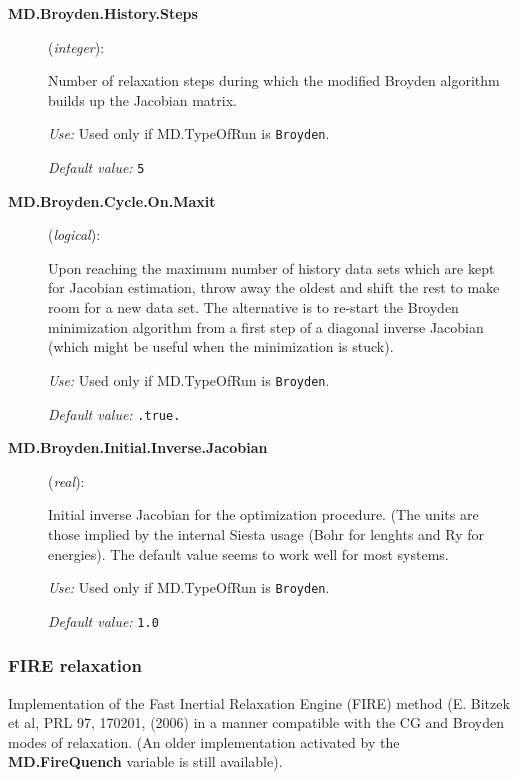 \begin{description}
\item [\textbf{MD.Broyden.History.Steps}] (\textit{integer}):

Number of relaxation steps during which the modified Broyden algorithm
builds up the Jacobian matrix.

\textit{Use:} Used only if MD.TypeOfRun is \texttt{Broyden}.

\textit{Default value:} \texttt{5}

\item [\textbf{MD.Broyden.Cycle.On.Maxit}] (\textit{logical}):

Upon reaching the maximum number of history data sets which are kept
for Jacobian estimation, throw away the oldest and shift the rest to
make room for a new data set. The alternative is to re-start the
Broyden minimization algorithm from a first step of a diagonal inverse
Jacobian (which might be useful when the minimization is
stuck).

\textit{Use:} Used only if MD.TypeOfRun is \texttt{Broyden}.

\textit{Default value:} \texttt{.true.}

\item[\textbf{MD.Broyden.Initial.Inverse.Jacobian}] (\textit{real}):

Initial inverse Jacobian for the optimization procedure. (The units
are those implied by the internal Siesta usage (Bohr for lenghts and
Ry for energies). The default value seems to work well for most systems.

\textit{Use:} Used only if MD.TypeOfRun is \texttt{Broyden}.

\textit{Default value:} \texttt{1.0}


\end{description}

\subsubsection{FIRE relaxation}

Implementation of the  Fast Inertial Relaxation
Engine (FIRE) method (E. Bitzek et al, PRL 97, 170201, (2006) in a
manner compatible with the CG and Broyden modes of relaxation. (An
older implementation activated by the \textbf{MD.FireQuench} variable is
still available).

